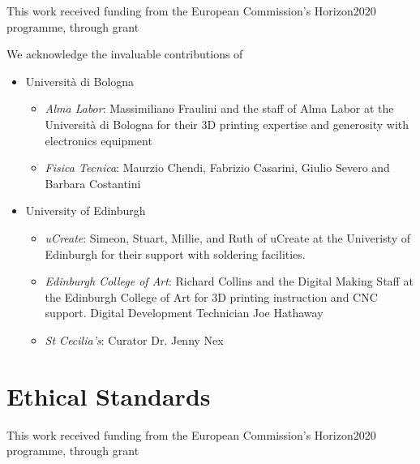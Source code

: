 \documentclass[sigconf]{nimeart}
\begin{document}
\maketitle




\begin{acks}
This work received funding from the European Commission's Horizon2020 programme, through grant 

 We acknowledge the invaluable contributions of
\begin{itemize}
\item
  Università di Bologna
  \begin{itemize}
  \item
    \emph{Alma Labor}:
      Massimiliano Fraulini and the staff of Alma Labor at the Università
      di Bologna for their 3D printing expertise and generosity with
      electronics equipment
  \item
    \emph{Fisica Tecnica}: Maurzio Chendi, Fabrizio Casarini, Giulio Severo and Barbara
      Costantini    
  \end{itemize}
\item
  University of Edinburgh
  \begin{itemize}
  \item
    \emph{uCreate}:    
      Simeon, Stuart, Millie, and Ruth of uCreate at the Univeristy of
      Edinburgh for their support with soldering facilities.    
  \item
    \emph{Edinburgh College of Art}: Richard Collins and the Digital Making Staff at the Edinburgh
      College of Art for 3D printing instruction and CNC support. Digital Development Technician Joe Hathaway    
    \item  
      \emph{St Cecilia's}: Curator Dr. Jenny Nex
  \end{itemize}
\end{itemize}

\end{acks}


\section{Ethical Standards}
This work received funding from the European Commission's Horizon2020 programme, through grant 



\end{document}
